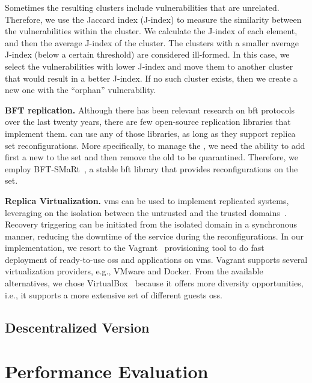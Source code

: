 Sometimes the resulting clusters include vulnerabilities that are unrelated. Therefore, we use the Jaccard index (J-index) to measure the similarity between the vulnerabilities within the cluster. We calculate the J-index of each element, and then the average J-index of the cluster. 
The clusters with a smaller average J-index (below a certain threshold) are considered ill-formed. In this case, we select the vulnerabilities with lower J-index and move them to another cluster that would result in a better J-index. If no such cluster exists, then we create a new one with the ``orphan'' vulnerability.

\textbf{BFT replication.}
Although there has been relevant research on \gls{bft} protocols over the last twenty years, there are few open-source replication libraries that implement them. \system can use any of those libraries, as long as they support replica set reconfigurations.
More specifically, to manage the \replicas, we need the ability to add first a new \replica to the set and then remove the old \replica to be quarantined. 
Therefore, we employ BFT-SMaRt~\cite{Bessani:2014}, a stable \gls{bft} library that provides reconfigurations on the \replicas set.

\textbf{Replica Virtualization.}
\glspl{vm} can be used to implement replicated systems, leveraging on the isolation between the untrusted and the trusted domains~\cite{Sousa:2010,Platania:2014,Distler:2011,Dettoni:2013}.
Recovery triggering can be initiated from the isolated domain in a synchronous manner, reducing the downtime of the service during the reconfigurations. 
In our implementation, we resort to the Vagrant~\cite{vagrant} provisioning tool to do fast deployment of ready-to-use \glspl{os} and applications on \glspl{vm}. 
Vagrant supports several virtualization providers, e.g., VMware and Docker. 
From the available alternatives, we chose VirtualBox~\cite{virtualbox} because it offers more diversity opportunities, i.e., it supports a more extensive set of different guests \glspl{os}.

\subsection{Descentralized \system Version}

\section{Performance Evaluation}
\label{sec:overhead}

